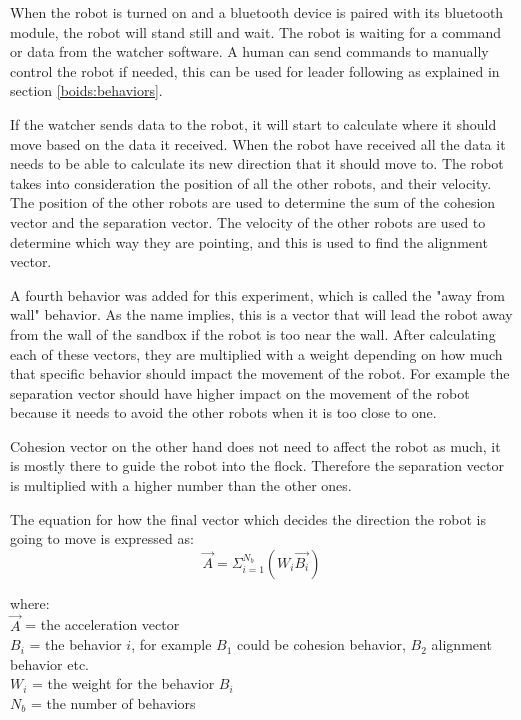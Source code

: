 When the robot is turned on and a bluetooth device is paired with its bluetooth module, the robot will stand still and wait. The robot is waiting for a command or data from the watcher software. A human can send commands to manually control the robot if needed, this can be used for leader following as explained in section \ref{boids:behaviors}. 

If the watcher sends data to the robot, it will start to calculate where it should move based on the data it received. 
When the robot have received all the data it needs to be able to calculate its new direction that it should move to. The robot takes into consideration the position of all the other robots, and their velocity. The position of the other robots are used to determine the sum of the cohesion vector and the separation vector. The velocity of the other robots are used to determine which way they are pointing, and this is used to find the alignment vector. 

A fourth behavior was added for this experiment, which is called the "away from wall" behavior. As the name implies, this is a vector that will lead the robot away from the wall of the sandbox if the robot is too near the wall. After calculating each of these vectors, they are multiplied with a weight depending on how much that specific behavior should impact the movement of the robot. For example the separation vector should have higher impact on the movement of the robot because it needs to avoid the other robots when it is too close to one. 

Cohesion vector on the other hand does not need to affect the robot as much, it is mostly there to guide the robot into the flock. Therefore the separation vector is multiplied with a higher number than the other ones.

The equation for how the final vector which decides the direction the robot is going to move is expressed as:
\begin{equation}
\label{eq:vecsum}
\vec{A} = \Sigma_{i=1}^{N_b}(W_i\vec{B_i})
\end{equation}

where:
\\
$\vec{A}$ = the acceleration vector
\\
$B_i$ = the behavior $i$, for example $B_1$ could be cohesion behavior, $B_2$ alignment behavior etc.
\\
$W_i$ = the weight for the behavior $B_i$\\
$N_b$ = the number of behaviors\\

